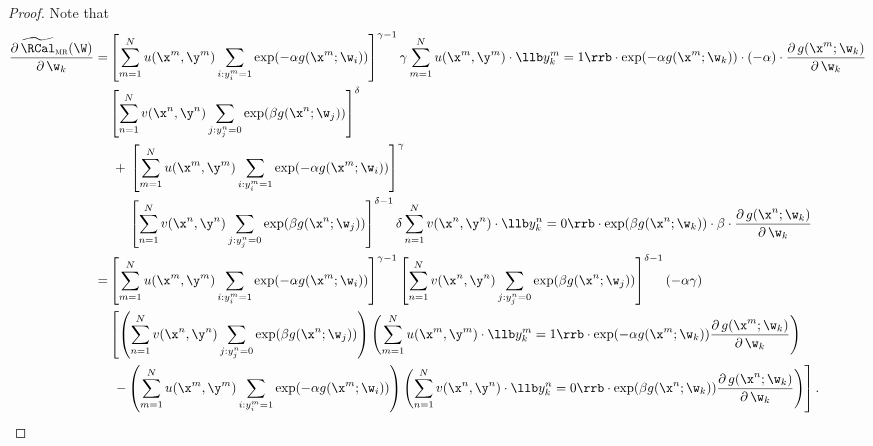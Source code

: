 \begin{proof}
Note that
\begin{equation}
\label{eq:grad_mr}
\begin{aligned}
\frac{\partial \, \widetilde\RCal_\textsc{mr}(\W)} {\partial \, \w_k}
=& \left[ \sum_{m=1}^N u(\x^m, \y^m) \sum_{i: y_i^m = 1} \exp(-\alpha g(\x^m; \w_i)) \right]^{\gamma-1} \gamma 
   \sum_{m=1}^N u(\x^m, \y^m) \cdot \llb y_k^m = 1 \rrb \cdot \exp(-\alpha g(\x^m; \w_k)) \cdot (-\alpha) \cdot 
   \frac{\partial \, g(\x^m; \w_k)}{\partial \, \w_k} \\
 & \left[ \sum_{n=1}^N v(\x^n, \y^n) \sum_{j: y_j^n = 0} \exp( \beta  g(\x^n; \w_j)) \right]^\delta \\
 & \ + \,
   \left[ \sum_{m=1}^N u(\x^m, \y^m) \sum_{i: y_i^m = 1} \exp(-\alpha g(\x^m; \w_i)) \right]^\gamma \\
 & \hspace{1.5em}
   \left[ \sum_{n=1}^N v(\x^n, \y^n) \sum_{j: y_j^n = 0} \exp( \beta  g(\x^n; \w_j)) \right]^{\delta-1} \delta
   \sum_{n=1}^N v(\x^n, \y^n) \cdot \llb y_k^n = 0 \rrb \cdot \exp( \beta  g(\x^n; \w_k)) \cdot \beta \cdot 
   \frac{\partial \, g(\x^n; \w_k)}{\partial \, \w_k} \\
=& \left[ \sum_{m=1}^N u(\x^m, \y^m) \sum_{i: y_i^m = 1} \exp(-\alpha g(\x^m; \w_i)) \right]^{\gamma-1}
   \left[ \sum_{n=1}^N v(\x^n, \y^n) \sum_{j: y_j^n = 0} \exp( \beta  g(\x^n; \w_j)) \right]^{\delta-1} (-\alpha \gamma) \\
 & \left[ 
   \left( \sum_{n=1}^N v(\x^n, \y^n) \sum_{j: y_j^n = 0} \exp( \beta  g(\x^n; \w_j)) \right)
   \left( \sum_{m=1}^N u(\x^m, \y^m) \cdot \llb y_k^m = 1 \rrb \cdot \exp(-\alpha g(\x^m; \w_k)) 
   \frac{\partial \, g(\x^m; \w_k)}{\partial \, \w_k} \right)
   \right. \\
 & \left. \ - 
   \left( \sum_{m=1}^N u(\x^m, \y^m) \sum_{i: y_i^m = 1} \exp(-\alpha g(\x^m; \w_i)) \right)
   \left( \sum_{n=1}^N v(\x^n, \y^n) \cdot \llb y_k^n = 0 \rrb \cdot \exp( \beta  g(\x^n; \w_k)) 
   \frac{\partial \, g(\x^n; \w_k)}{\partial \, \w_k} \right)
   \right].
\end{aligned}
\end{equation}


\end{proof}
